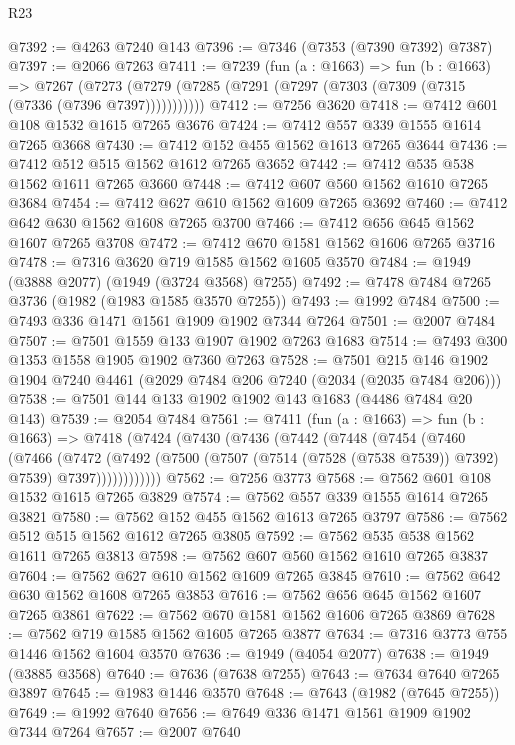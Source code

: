 \begin{lexlean}{R23}
\begin{coremodule}
@7392 := @4263 @7240 @143
@7396 := @7346 (@7353 (@7390 @7392) @7387)
@7397 := @2066 @7263
@7411 := @7239
    (fun (a : @1663) =>
    fun (b : @1663) =>
    @7267 (@7273 (@7279 (@7285 (@7291 (@7297 (@7303 (@7309 (@7315 (@7336 (@7396 @7397)))))))))))
@7412 := @7256 @3620
@7418 := @7412 @601 @108 @1532 @1615 @7265 @3676
@7424 := @7412 @557 @339 @1555 @1614 @7265 @3668
@7430 := @7412 @152 @455 @1562 @1613 @7265 @3644
@7436 := @7412 @512 @515 @1562 @1612 @7265 @3652
@7442 := @7412 @535 @538 @1562 @1611 @7265 @3660
@7448 := @7412 @607 @560 @1562 @1610 @7265 @3684
@7454 := @7412 @627 @610 @1562 @1609 @7265 @3692
@7460 := @7412 @642 @630 @1562 @1608 @7265 @3700
@7466 := @7412 @656 @645 @1562 @1607 @7265 @3708
@7472 := @7412 @670 @1581 @1562 @1606 @7265 @3716
@7478 := @7316 @3620 @719 @1585 @1562 @1605 @3570
@7484 := @1949 (@3888 @2077) (@1949 (@3724 @3568) @7255)
@7492 := @7478 @7484 @7265 @3736 (@1982 (@1983 @1585 @3570 @7255))
@7493 := @1992 @7484
@7500 := @7493 @336 @1471 @1561 @1909 @1902 @7344 @7264
@7501 := @2007 @7484
@7507 := @7501 @1559 @133 @1907 @1902 @7263 @1683
@7514 := @7493 @300 @1353 @1558 @1905 @1902 @7360 @7263
@7528 := @7501 @215 @146 @1902 @1904 @7240 @4461 (@2029 @7484 @206 @7240 (@2034 (@2035 @7484 @206)))
@7538 := @7501 @144 @133 @1902 @1902 @143 @1683 (@4486 @7484 @20 @143)
@7539 := @2054 @7484
@7561 := @7411
    (fun (a : @1663) =>
    fun (b : @1663) =>
    @7418
      (@7424
        (@7430
          (@7436
            (@7442
              (@7448
                (@7454
                  (@7460
                    (@7466
                      (@7472
                        (@7492
                          (@7500 (@7507 (@7514 (@7528 (@7538 @7539)) @7392) @7539) @7397))))))))))))
@7562 := @7256 @3773
@7568 := @7562 @601 @108 @1532 @1615 @7265 @3829
@7574 := @7562 @557 @339 @1555 @1614 @7265 @3821
@7580 := @7562 @152 @455 @1562 @1613 @7265 @3797
@7586 := @7562 @512 @515 @1562 @1612 @7265 @3805
@7592 := @7562 @535 @538 @1562 @1611 @7265 @3813
@7598 := @7562 @607 @560 @1562 @1610 @7265 @3837
@7604 := @7562 @627 @610 @1562 @1609 @7265 @3845
@7610 := @7562 @642 @630 @1562 @1608 @7265 @3853
@7616 := @7562 @656 @645 @1562 @1607 @7265 @3861
@7622 := @7562 @670 @1581 @1562 @1606 @7265 @3869
@7628 := @7562 @719 @1585 @1562 @1605 @7265 @3877
@7634 := @7316 @3773 @755 @1446 @1562 @1604 @3570
@7636 := @1949 (@4054 @2077)
@7638 := @1949 (@3885 @3568)
@7640 := @7636 (@7638 @7255)
@7643 := @7634 @7640 @7265 @3897
@7645 := @1983 @1446 @3570
@7648 := @7643 (@1982 (@7645 @7255))
@7649 := @1992 @7640
@7656 := @7649 @336 @1471 @1561 @1909 @1902 @7344 @7264
@7657 := @2007 @7640

\end{coremodule}
\end{lexlean}

